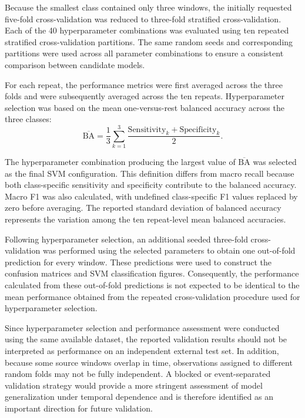 \documentclass[11pt,a4paper]{article}
\begin{document}
Because the smallest class contained only three windows, the initially requested five-fold cross-validation was reduced to three-fold stratified cross-validation. Each of the 40 hyperparameter combinations was evaluated using ten repeated stratified cross-validation partitions. The same random seeds and corresponding partitions were used across all parameter combinations to ensure a consistent comparison between candidate models.

For each repeat, the performance metrics were first averaged across the three folds and were subsequently averaged across the ten repeats. Hyperparameter selection was based on the mean one-versus-rest balanced accuracy across the three classes:
\begin{equation}
	\overline{\mathrm{BA}}
	=
	\frac{1}{3}
	\sum_{k=1}^{3}
	\frac{
		\mathrm{Sensitivity}_k
		+
		\mathrm{Specificity}_k
	}{2}.
\end{equation}

The hyperparameter combination producing the largest value of \(\overline{\mathrm{BA}}\) was selected as the final SVM configuration. This definition differs from macro recall because both class-specific sensitivity and specificity contribute to the balanced accuracy. Macro F1 was also calculated, with undefined class-specific F1 values replaced by zero before averaging. The reported standard deviation of balanced accuracy represents the variation among the ten repeat-level mean balanced accuracies.

Following hyperparameter selection, an additional seeded three-fold cross-validation was performed using the selected parameters to obtain one out-of-fold prediction for every window. These predictions were used to construct the confusion matrices and SVM classification figures. Consequently, the performance calculated from these out-of-fold predictions is not expected to be identical to the mean performance obtained from the repeated cross-validation procedure used for hyperparameter selection.

Since hyperparameter selection and performance assessment were conducted using the same available dataset, the reported validation results should not be interpreted as performance on an independent external test set. In addition, because some source windows overlap in time, observations assigned to different random folds may not be fully independent. A blocked or event-separated validation strategy would provide a more stringent assessment of model generalization under temporal dependence and is therefore identified as an important direction for future validation.
	
\end{document}
